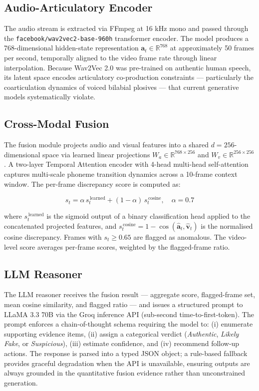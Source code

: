 \documentclass[12pt]{article}
\begin{document}
\subsection{Audio-Articulatory Encoder}

The audio stream is extracted via FFmpeg at 16 kHz mono and passed through the
\texttt{facebook/wav2vec2-base-960h} transformer encoder.
The model produces a 768-dimensional hidden-state representation
$\mathbf{a}_{t} \in \mathbb{R}^{768}$ at approximately 50 frames per second,
temporally aligned to the video frame rate through linear interpolation.
Because Wav2Vec 2.0 was pre-trained on authentic human speech, its latent space
encodes articulatory co-production constraints --- particularly the coarticulation
dynamics of voiced bilabial plosives --- that current generative models
systematically violate.

\subsection{Cross-Modal Fusion}

The fusion module projects audio and visual features into a shared
$d = 256$-dimensional space via learned linear projections
$W_{a} \in \mathbb{R}^{768 \times 256}$ and
$W_{v} \in \mathbb{R}^{256 \times 256}$.
A two-layer Temporal Attention encoder with 4-head multi-head self-attention
captures multi-scale phoneme transition dynamics across a 10-frame context
window.
The per-frame discrepancy score is computed as:

\begin{equation}
  s_{t} = \alpha\, s_{t}^{\,\text{learned}}
        + (1-\alpha)\, s_{t}^{\,\text{cosine}}, \quad \alpha = 0.7
  \label{eq:score}
\end{equation}

where $s_{t}^{\,\text{learned}}$ is the sigmoid output of a binary
classification head applied to the concatenated projected features, and
$s_{t}^{\,\text{cosine}} = 1 - \cos(\hat{\mathbf{a}}_{t}, \hat{\mathbf{v}}_{t})$
is the normalised cosine discrepancy.
Frames with $s_{t} \geq 0.65$ are flagged as anomalous.
The video-level score averages per-frame scores, weighted by the flagged-frame
ratio.

\subsection{LLM Reasoner}

The LLM reasoner receives the fusion result --- aggregate score, flagged-frame
set, mean cosine similarity, and flagged ratio --- and issues a structured prompt
to LLaMA 3.3 70B via the Groq inference API (sub-second time-to-first-token).
The prompt enforces a chain-of-thought schema requiring the model to:
(i) enumerate supporting evidence items,
(ii) assign a categorical verdict
    (\textit{Authentic}, \textit{Likely Fake}, or \textit{Suspicious}),
(iii) estimate confidence, and
(iv) recommend follow-up actions.
The response is parsed into a typed JSON object; a rule-based fallback provides
graceful degradation when the API is unavailable, ensuring outputs are always
grounded in the quantitative fusion evidence rather than unconstrained generation.
\end{document}
